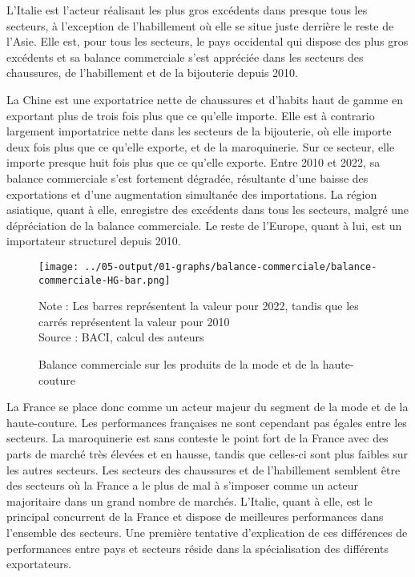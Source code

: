\documentclass[french,10pt,a4paper]{article}
\begin{document}
L'Italie est l'acteur réalisant les plus gros excédents dans presque tous les secteurs, à l'exception de l'habillement où elle se situe juste derrière le reste de l'Asie. Elle est, pour tous les secteurs, le pays occidental qui dispose des plus gros excédents et sa balance commerciale s'est appréciée dans les secteurs des chaussures, de l'habillement et de la bijouterie depuis 2010.

La Chine est une exportatrice nette de chaussures et d'habits haut de gamme en exportant plus de trois fois plus que ce qu'elle importe. Elle est à contrario largement importatrice nette dans les secteurs de la bijouterie, où elle importe deux fois plus que ce qu'elle exporte, et de la maroquinerie. Sur ce secteur, elle importe presque huit fois plus que ce qu'elle exporte. Entre 2010 et 2022, sa balance commerciale s'est fortement dégradée, résultante d'une baisse des exportations et d'une augmentation simultanée des importations. La région asiatique, quant à elle, enregistre des excédents dans tous les secteurs, malgré une dépréciation de la balance commerciale. Le reste de l'Europe, quant à lui, est un importateur structurel depuis 2010. 

\begin{figure}[!h]
  \centering
  \texttt{[image: ../05-output/01-graphs/balance-commerciale/balance-commerciale-HG-bar.png]}
  \captionsetup{justification=justified, singlelinecheck=false, font=small}
  \caption*{Note : Les barres représentent la valeur pour 2022, tandis que les carrés représentent la valeur pour 2010 \\
  Source : BACI, calcul des auteurs}
  \captionsetup{justification=centering, singlelinecheck=true, font=normalsize}
  \caption{Balance commerciale sur les produits de la mode et de la haute-couture}
  \label{fig:balance-commerciale}
\end{figure}

\bigskip

La France se place donc comme un acteur majeur du segment de la mode et de la haute-couture. Les performances françaises ne sont cependant pas égales entre les secteurs. La maroquinerie est sans conteste le point fort de la France avec des parts de marché très élevées et en hausse, tandis que celles-ci sont plus faibles sur les autres secteurs. Les secteurs des chaussures et de l'habillement semblent être des secteurs où la France a le plus de mal à s'imposer comme un acteur majoritaire dans un grand nombre de marchés. L'Italie, quant à elle, est le principal concurrent de la France et dispose de meilleures performances dans l'ensemble des secteurs. Une première tentative d'explication de ces différences de performances entre pays et secteurs réside dans la spécialisation des différents exportateurs.
\end{document}
